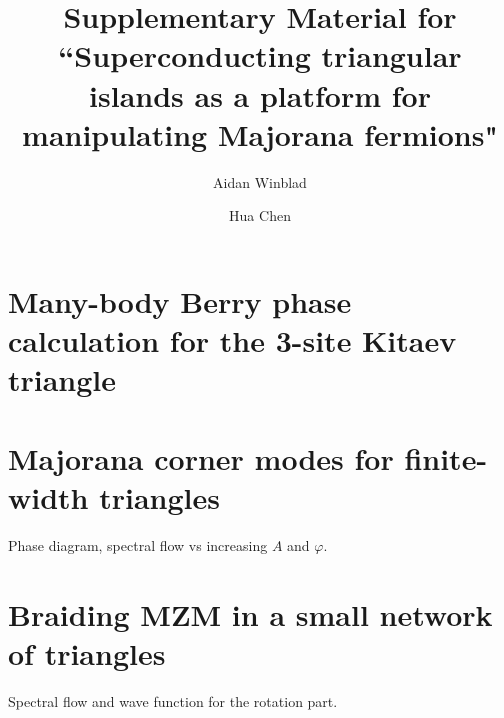 \documentclass[aps,prb,showpacs,amsmath,amssymb,superscriptaddress]{revtex4-2}
\begin{document}
	
\title{Supplementary Material for ``Superconducting triangular islands as a platform for manipulating Majorana fermions"}
	
\author{Aidan Winblad}

\author{Hua Chen}

\maketitle

\section{Many-body Berry phase calculation for the 3-site Kitaev triangle}


\section{Majorana corner modes for finite-width triangles}

Phase diagram, spectral flow vs increasing $A$ and $\varphi$.

\section{Braiding MZM in a small network of triangles}
Spectral flow and wave function for the rotation part.



\end{document}
